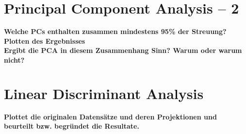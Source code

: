 \documentclass[a4paper]{scrartcl}
\begin{document}
\section{Principal Component Analysis – 2}

\textbf{Welche PCs enthalten zusammen mindestens  95\% der Streuung?}\\


\textbf{Plotten des Ergebnisses}\\


\textbf{Ergibt die PCA in diesem Zusammenhang Sinn? Warum oder warum nicht?}\\
   
\section{Linear Discriminant Analysis}

\textbf{Plottet die originalen Datensätze und deren Projektionen und beurteilt bzw. begründet die Resultate.}

\end{document}
